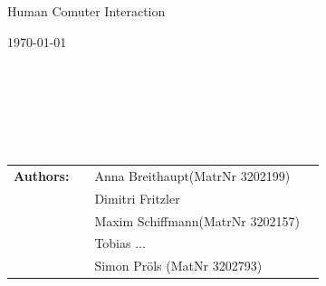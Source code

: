 \begin{center}
	\Large{Human Comuter Interaction}
\end{center}
\begin{center}

\end{center}
\begin{center}
{\large \today\par}
\end{center}
\begin{verbatim}






\end{verbatim}
\begin{flushleft}
\begin{tabular}{llll}
\textbf{Authors:} & & Anna Breithaupt(MatrNr 3202199)\\  &&Dimitri Fritzler\\ &&Maxim Schiffmann(MatrNr 3202157)\\ &&Tobias ...\\ &&Simon Pröls (MatNr 3202793)
\end{tabular}
\end{flushleft}




